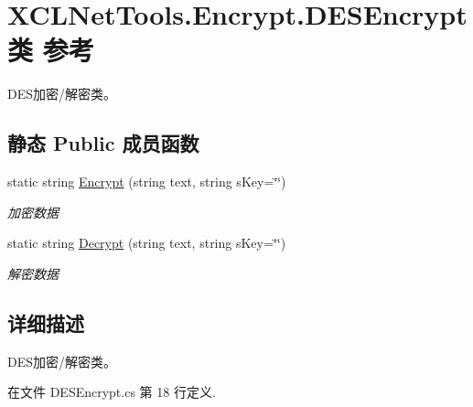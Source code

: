 \hypertarget{class_x_c_l_net_tools_1_1_encrypt_1_1_d_e_s_encrypt}{\section{X\-C\-L\-Net\-Tools.\-Encrypt.\-D\-E\-S\-Encrypt类 参考}
\label{class_x_c_l_net_tools_1_1_encrypt_1_1_d_e_s_encrypt}
}


D\-E\-S加密/解密类。  


\subsection*{静态 Public 成员函数}
\begin{DoxyCompactItemize}
\item 
static string \hyperlink{class_x_c_l_net_tools_1_1_encrypt_1_1_d_e_s_encrypt_a5bd946e26e2f43cc6b2d999df6b9d88d}{Encrypt} (string text, string s\-Key=\char`\"{}\char`\"{})
\begin{DoxyCompactList}\small\item\em 加密数据 \end{DoxyCompactList}\item 
static string \hyperlink{class_x_c_l_net_tools_1_1_encrypt_1_1_d_e_s_encrypt_a2455ab42f563bee03bf39c6f6eb9b2d1}{Decrypt} (string text, string s\-Key=\char`\"{}\char`\"{})
\begin{DoxyCompactList}\small\item\em 解密数据 \end{DoxyCompactList}\end{DoxyCompactItemize}


\subsection{详细描述}
D\-E\-S加密/解密类。 



在文件 D\-E\-S\-Encrypt.\-cs 第 18 行定义.



